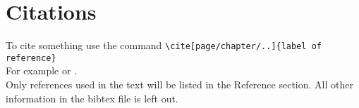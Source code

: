 \chapter{Citations}
To cite something use the command \verb+\cite[page/chapter/..]{label of reference}+\\
For example \cite[Chapter 1]{Cramer2004} or \cite{Dickson2014}.\\
Only references used in the text will be listed in the Reference section. All other information in the bibtex file is left out.